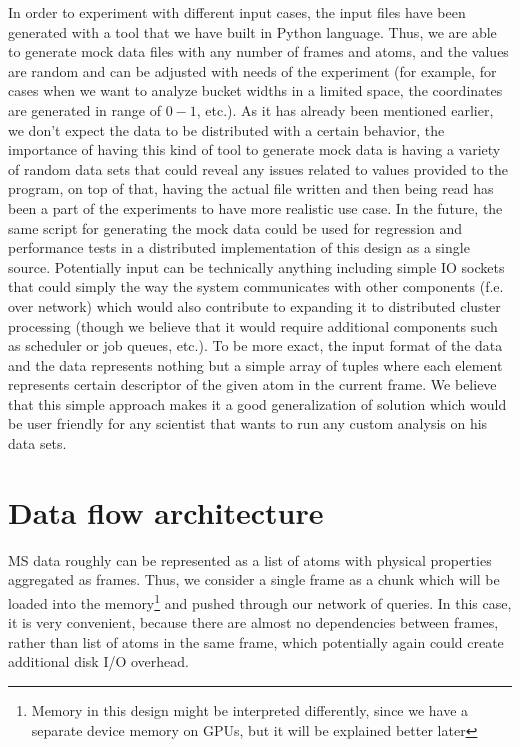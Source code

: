 \documentclass[11pt,a4paper]{report}
\begin{document}
In order to experiment with different input cases, the input files have been generated with a tool that we have built in Python language. Thus, we are able to generate mock data files with any number of frames and atoms, and the values are random and can be adjusted with needs of the experiment (for example, for cases when we want to analyze bucket widths in a limited space, the coordinates are generated in range of $0 - 1$, etc.). As it has already been mentioned earlier, we don't expect the data to be distributed with a certain behavior, the importance of having this kind of tool to generate mock data is having a variety of random data sets that could reveal any issues related to values provided to the program, on top of that, having the actual file written and then being read has been a part of the experiments to have more realistic use case. In the future, the same script for generating the mock data could be used for regression and performance tests in a distributed implementation of this design as a single source. Potentially input can be technically anything including simple IO sockets that could simply the way the system communicates with other components (f.e. over network) which would also contribute to expanding it to distributed cluster processing (though we believe that it would require additional components such as scheduler or job queues, etc.). To be more exact, the input format of the data and the data represents nothing but a simple array of tuples where each element represents certain descriptor of the given atom in the current frame. We believe that this simple approach makes it a good generalization of solution which would be user friendly for any scientist that wants to run any custom analysis on his data sets.

\section{Data flow architecture}

MS data roughly can be represented as a list of atoms with physical properties aggregated as frames. Thus, we consider a single frame as a chunk which will be loaded into the memory\footnote{Memory in this design might be interpreted differently, since we have a separate device memory on GPUs, but it will be explained better later} and pushed through our network of queries. In this case, it is very convenient, because there are almost no dependencies between frames, rather than list of atoms in the same frame, which potentially again could create additional disk I/O overhead.
\end{document}
